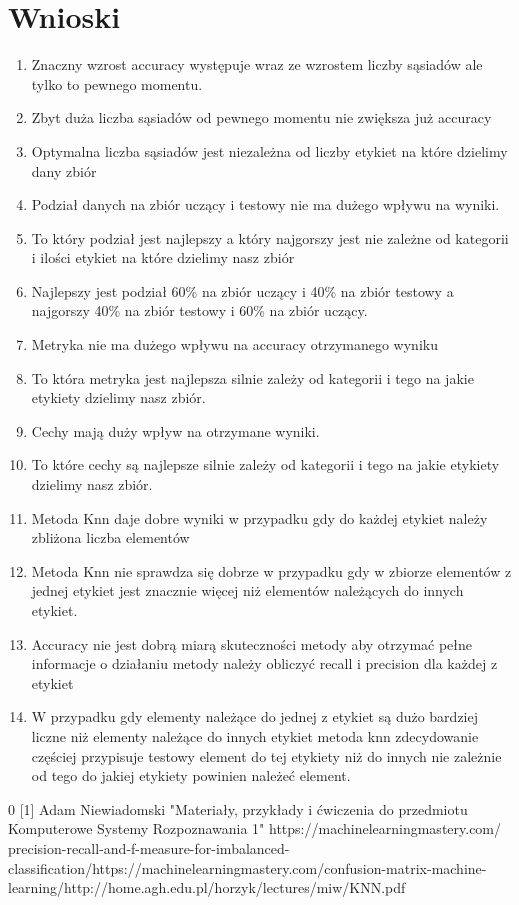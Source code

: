 \documentclass{classrep}
\begin{document}
\section{Wnioski}
{
\begin{enumerate}
\item  Znaczny wzrost accuracy występuje wraz ze wzrostem liczby sąsiadów ale tylko to pewnego momentu.
\item  Zbyt duża liczba sąsiadów od pewnego momentu nie zwiększa już accuracy
\item  Optymalna liczba sąsiadów jest niezależna od liczby etykiet na które dzielimy dany zbiór
\item  Podział danych na zbiór uczący i testowy nie ma dużego wpływu na wyniki. 
\item  To który podział jest najlepszy a który najgorszy jest nie zależne od kategorii i ilości etykiet na które dzielimy nasz zbiór
\item  Najlepszy jest podział 60\% na zbiór uczący i 40\% na zbiór testowy a najgorszy 40\% na zbiór testowy i 60\% na zbiór uczący.
\item  Metryka nie ma dużego wpływu na accuracy otrzymanego wyniku
\item  To która metryka jest najlepsza silnie zależy od kategorii i tego na jakie etykiety dzielimy nasz zbiór.
\item  Cechy mają duży wpływ na otrzymane wyniki.
\item  To które cechy są najlepsze silnie zależy od kategorii i tego na jakie etykiety dzielimy nasz zbiór.
\item  Metoda Knn daje dobre wyniki w przypadku gdy do każdej etykiet należy zbliżona  liczba elementów
\item  Metoda Knn nie sprawdza się dobrze w przypadku gdy w zbiorze elementów z jednej etykiet jest znacznie więcej niż elementów należących do innych etykiet.
\item  Accuracy nie jest dobrą miarą skuteczności metody aby otrzymać pełne informacje o działaniu metody należy obliczyć recall i precision dla każdej z etykiet 
\item W przypadku gdy elementy należące do jednej z etykiet są dużo bardziej liczne niż elementy należące do innych etykiet metoda knn zdecydowanie częściej przypisuje testowy element do tej etykiety niż do innych nie zależnie od tego do jakiej etykiety powinien należeć element. 


\end{enumerate}
}


\begin{thebibliography}{0}
[1] Adam Niewiadomski "Materiały, przykłady i ćwiczenia do przedmiotu Komputerowe Systemy Rozpoznawania 1" \newline
[2] https://machinelearningmastery.com/\newline
precision-recall-and-f-measure-for-imbalanced-classification/\newline
[3] https://machinelearningmastery.com/confusion-matrix-machine-learning/\newline
[4] http://home.agh.edu.pl/horzyk/lectures/miw/KNN.pdf\newline
\end{thebibliography}
\end{document}
